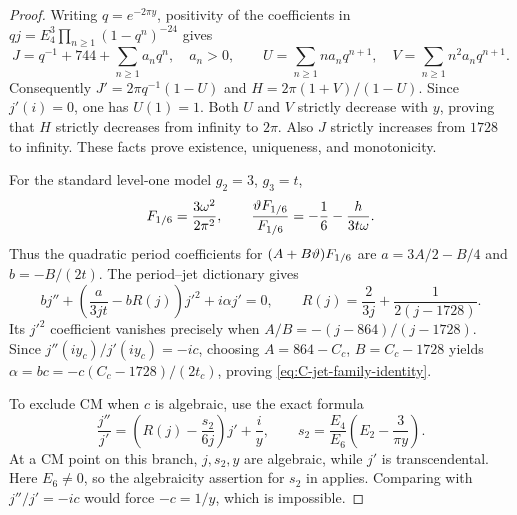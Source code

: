 \begin{proof}
Writing $q=e^{-2\pi y}$, positivity of the coefficients in
$qj=E_4^3\prod_{n\ge1}(1-q^n)^{-24}$ gives
\[
 J=q^{-1}+744+\sum_{n\ge1}a_nq^n,\quad a_n>0,\qquad
 U=\sum_{n\ge1}na_nq^{n+1},\quad
 V=\sum_{n\ge1}n^2a_nq^{n+1}.
\]
Consequently $J'=2\pi q^{-1}(1-U)$ and
$H=2\pi(1+V)/(1-U)$. Since $j'(i)=0$, one has $U(1)=1$.
Both $U$ and $V$ strictly decrease with $y$, proving that $H$ strictly
decreases from infinity to $2\pi$. Also $J$ strictly increases from $1728$
to infinity. These facts prove existence, uniqueness, and monotonicity.

For the standard level-one model $g_2=3$, $g_3=t$,
\[
 F_{1/6}=\frac{3\omega^2}{2\pi^2},\qquad
 \frac{\vartheta F_{1/6}}{F_{1/6}}
 =-\frac16-\frac{h}{3t\omega}.
\]
Thus the quadratic period coefficients for $(A+B\vartheta)F_{1/6}$ are
$a=3A/2-B/4$ and $b=-B/(2t)$. The period--jet dictionary gives
\[
 bj''+\left(\frac{a}{3jt}-bR(j)\right)j'^2+i\alpha j'=0,
 \qquad R(j)=\frac2{3j}+\frac1{2(j-1728)}.
\]
Its $j'^2$ coefficient vanishes precisely when
$A/B=-(j-864)/(j-1728)$. Since $j''(iy_c)/j'(iy_c)=-ic$,
choosing $A=864-C_c$, $B=C_c-1728$ yields
$\alpha=bc=-c(C_c-1728)/(2t_c)$, proving
\eqref{eq:C-jet-family-identity}.

To exclude CM when $c$ is algebraic, use the exact formula
\[
 \frac{j''}{j'}=
 \left(R(j)-\frac{s_2}{6j}\right)j'+\frac{i}{y},\qquad
 s_2=\frac{E_4}{E_6}\left(E_2-\frac3{\pi y}\right).
\]
At a CM point on this branch, $j,s_2,y$ are algebraic, while $j'$ is
transcendental. Here $E_6\ne0$, so the algebraicity assertion for $s_2$
in \cite[Theorem~8.1]{CGG} applies. Comparing with $j''/j'=-ic$ would
force $-c=1/y$, which is impossible.


\end{proof}
